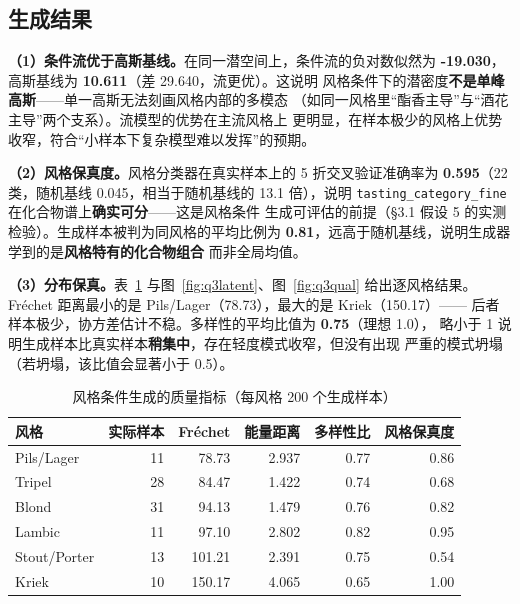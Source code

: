
\subsection{生成结果}\label{sec:q3style}

\textbf{（1）条件流优于高斯基线。}在同一潜空间上，条件流的负对数似然为
\textbf{-19.030}，高斯基线为 \textbf{10.611}（差 29.640，流更优）。这说明
风格条件下的潜密度\textbf{不是单峰高斯}——单一高斯无法刻画风格内部的多模态
（如同一风格里“酯香主导”与“酒花主导”两个支系）。流模型的优势在主流风格上
更明显，在样本极少的风格上优势收窄，符合“小样本下复杂模型难以发挥”的预期。

\textbf{（2）风格保真度。}风格分类器在真实样本上的 5 折交叉验证准确率为
\textbf{0.595}（22 类，随机基线 0.045，相当于随机基线的 13.1 倍），说明
\texttt{tasting\_category\_fine} 在化合物谱上\textbf{确实可分}——这是风格条件
生成可评估的前提（\S3.1 假设 5 的实测检验）。生成样本被判为同风格的平均比例为
\textbf{0.81}，远高于随机基线，说明生成器学到的是\textbf{风格特有的化合物组合}
而非全局均值。

\textbf{（3）分布保真。}表~\ref{tab:q3gen} 与图~\ref{fig:q3latent}、图~\ref{fig:q3qual}
给出逐风格结果。Fréchet 距离最小的是 Pils/Lager（78.73），最大的是 Kriek（150.17）——
后者样本极少，协方差估计不稳。多样性的平均比值为 \textbf{0.75}（理想 1.0），
略小于 1 说明生成样本比真实样本\textbf{稍集中}，存在轻度模式收窄，但没有出现
严重的模式坍塌（若坍塌，该比值会显著小于 0.5）。

\begin{table}[H]
\centering
\caption{风格条件生成的质量指标（每风格 200 个生成样本）}
\label{tab:q3gen}
\small
\begin{fittable}
\begin{tabular}{@{}lrrrrr@{}}
\toprule
风格 & 实际样本 & Fréchet & 能量距离 & 多样性比 & 风格保真度 \\
\midrule
Pils/Lager & 11 & 78.73 & 2.937 & 0.77 & 0.86 \\
Tripel & 28 & 84.47 & 1.422 & 0.74 & 0.68 \\
Blond & 31 & 94.13 & 1.479 & 0.76 & 0.82 \\
Lambic & 11 & 97.10 & 2.802 & 0.82 & 0.95 \\
Stout/Porter & 13 & 101.21 & 2.391 & 0.75 & 0.54 \\
Kriek & 10 & 150.17 & 4.065 & 0.65 & 1.00 \\
\bottomrule
\end{tabular}
\end{fittable}
\end{table}

